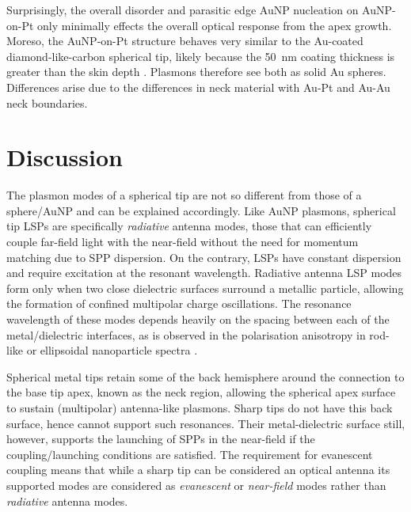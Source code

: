 \documentclass{article}
\begin{document}
Surprisingly, the overall disorder and parasitic edge AuNP nucleation on AuNP-on-Pt only minimally effects the overall optical response from the apex growth. Moreso, the AuNP-on-Pt structure behaves very similar to the Au-coated diamond-like-carbon spherical tip, likely because the \SI{50}{nm} coating thickness is greater than the skin depth \cite{stockman2011, huber2014}. Plasmons therefore see both as solid Au spheres. Differences arise due to the differences in neck material with Au-Pt and Au-Au neck boundaries.

\FloatBarrier
\section{Discussion}

The plasmon modes of a spherical tip are not so different from those of a {\color{red}sphere/AuNP} and can be explained accordingly. Like AuNP plasmons, spherical tip LSPs are specifically \emph{radiative} antenna modes, those that can efficiently couple far-field light with the near-field without the need for  momentum matching due to SPP dispersion. {\color{red}On the contrary, LSPs have constant dispersion and require excitation at the resonant wavelength.}  Radiative antenna LSP modes form only when two close dielectric surfaces surround a metallic particle, allowing the formation of confined multipolar charge oscillations. The resonance wavelength of these modes depends heavily on the spacing between each of the metal/dielectric interfaces, as is observed in the polarisation anisotropy in rod-like or ellipsoidal nanoparticle spectra \cite{mock2002, kuwata2003}.

Spherical metal tips retain some of the back hemisphere around the connection to the base tip apex, known as the neck region, allowing the spherical apex surface to sustain (multipolar) antenna-like plasmons. Sharp tips do not have this back surface, hence cannot support such resonances.
Their metal-dielectric surface still, however, supports the launching of SPPs in the near-field if the {\color{red}coupling/launching} conditions are satisfied. The requirement for evanescent coupling means that while a sharp tip can be considered an optical antenna its supported modes are considered as \emph{evanescent} or \emph{near-field} modes rather than \emph{radiative} antenna modes. 

\FloatBarrier
\end{document}
